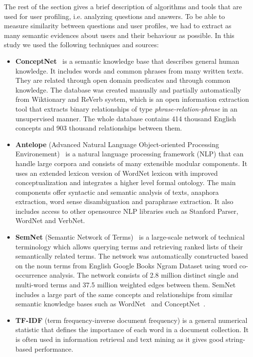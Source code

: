 \documentclass[conference]{IEEEtran}
\begin{document}
The rest of the section gives a brief description of algorithms and tools that are used for user profiling, i.e. analyzing questions and answers. To be able to measure similarity between questions and user profiles, we had to extract as many semantic evidences about users and their behaviour as possible. In this study we used the following techniques and sources:
\begin{itemize}
	\item {\bf ConceptNet}~\cite{bib:conceptnet} is a semantic knowledge base that describes general human knowledge. It includes words and common phrases from many written texts. They are related through open domain predicates and through common knowledge. The database was created manually and partially automatically from Wiktionary and ReVerb system, which is an open information extraction tool that extracts binary relationships of type {\it phrase-relation-phrase} in an unsupervised manner. The whole database contains 414 thousand English concepts and 903 thousand relationships between them.
	\item {\bf Antelope} (Advanced Natural Language Object-oriented Processing Environement)~\cite{bib:antelope} is a natural language processing framework (NLP) that can handle large corpora and consists of many extensible modular components. It uses an extended lexicon version of WordNet lexicon with improved conceptualization and integrates a higher level formal ontology. The main components offer syntactic and semantic analysis of texts, anaphora extraction, word sense disambiguation and paraphrase extraction. It also includes access to other opensource NLP libraries such as Stanford Parser, WordNet and VerbNet.
	\item {\bf SemNet} (Semantic Network of Terms)~\cite{bib:semnet} is a large-scale network of technical terminology which allows querying terms and retrieving ranked lists of their semantically related terms. The network was automatically constructed based on the noun terms from English Google Books Ngram Dataset using word co-occurrence analysis. The network consists of 2.8 million distinct single and multi-word terms and 37.5 million weighted edges between them. SemNet includes a large part of the same concepts and relationships from similar semantic knowledge bases such as WordNet~\cite{bib:wordnet} and ConceptNet~\cite{bib:conceptnet}. 
	\item {\bf TF-IDF} (term frequency-inverse document frequency) is a general numerical statistic that defines the importance of each word in a document collection. It is often used in information retrieval and text mining as it gives good string-based performance. 
\end{itemize}
	
\end{document}
